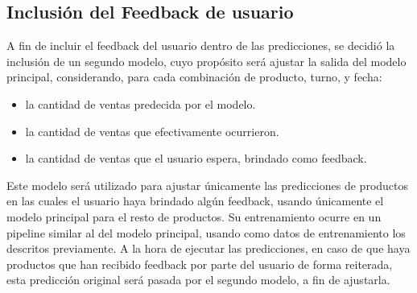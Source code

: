 \subsection{Inclusión del Feedback de usuario}\label{sec:inclusion-feedback-usuario}

A fin de incluir el feedback del usuario dentro de las predicciones, se decidió la inclusión de un segundo modelo, cuyo propósito será ajustar la salida del modelo principal, considerando, para cada combinación de producto, turno, y fecha: 

\begin{itemize}
    \item la cantidad de ventas predecida por el modelo.
    \item la cantidad de ventas que efectivamente ocurrieron.
    \item la cantidad de ventas que el usuario espera, brindado como feedback.
\end{itemize}

Este modelo será utilizado para ajustar únicamente las predicciones de productos en las cuales el usuario haya brindado algún feedback, usando únicamente el modelo principal para el resto de productos. Su entrenamiento ocurre en un pipeline similar al del modelo principal, usando como datos de entrenamiento los descritos previamente. A la hora de ejecutar las predicciones, en caso de que haya productos que han recibido feedback por parte del usuario de forma reiterada, esta predicción original será pasada por el segundo modelo, a fin de ajustarla.

